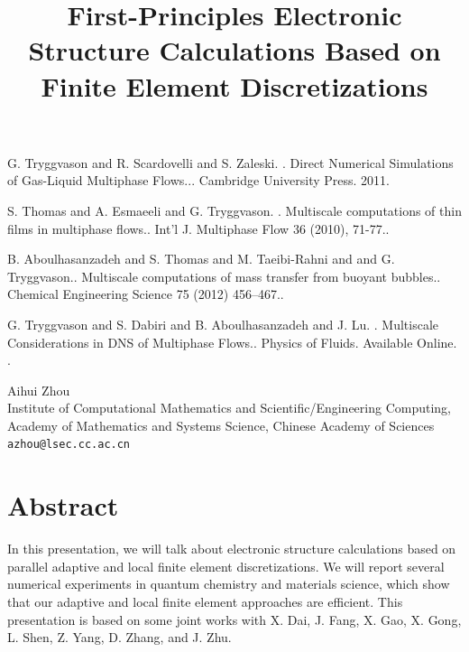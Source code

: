 \documentclass[article, A4, 11pt]{llncs}%
\begin{document}


\begin{thebibliography}{10}
{\sc G. Tryggvason and R. Scardovelli and S. Zaleski. }. {Direct Numerical Simulations of Gas-Liquid Multiphase Flows..}. Cambridge University Press. 2011.

{\sc S. Thomas and A. Esmaeeli and G. Tryggvason. }. {Multiscale computations of thin films in multiphase flows.}. Int'l J. Multiphase Flow 36 (2010), 71-77..

{\sc B. Aboulhasanzadeh and S. Thomas and M. Taeibi-Rahni and and G. Tryggvason.}. {Multiscale computations of mass transfer from buoyant bubbles.}. Chemical Engineering Science 75 (2012) 456–467..

{\sc G. Tryggvason and S. Dabiri and B. Aboulhasanzadeh and J. Lu. }. {Multiscale Considerations in DNS of Multiphase Flows.}. Physics of Fluids. Available Online. .
\end{thebibliography} %

\title{First-Principles Electronic Structure Calculations Based on Finite Element Discretizations}
 \author{} \institute{}
\maketitle
\begin{center}
{\large Aihui Zhou}\\
Institute of Computational Mathematics and Scientific/Engineering Computing, Academy of Mathematics and Systems Science, Chinese Academy of Sciences\\
{\tt azhou@lsec.cc.ac.cn}
\end{center}

\section*{Abstract}
In this presentation, we will talk about electronic structure calculations based on parallel adaptive and local finite element discretizations. We will report several numerical experiments in quantum chemistry and materials science, which show that our adaptive and local finite element approaches are efficient. This presentation is based on some joint works with X. Dai, J. Fang, X. Gao, X. Gong, L. Shen, Z. Yang, D. Zhang, and J. Zhu.
\end{document}
